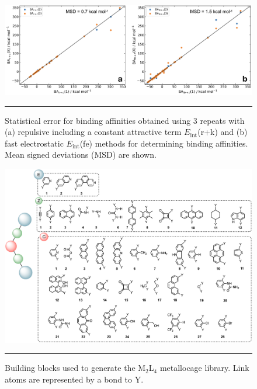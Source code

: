 \documentclass[../../main.tex]{subfiles}
\newcommand{\MLf}{M$_2$L$_4$ }
\begin{document}
\begin{figure}[h!]
	\vspace{0.4cm}
	\centering
	\includegraphics[width=\textwidth]{3/cgbind/figs/figS6}
	\vspace{0.2cm}
	\hrule
	\caption{Statistical error for binding affinities obtained using 3 repeats with (a) repulsive including a constant attractive term $E_\text{int}$(r+k) and (b) fast electrostatic $E_\text{int}$(fe) methods for determining binding affinities. Mean signed deviations (MSD) are shown.}
	\label{fig::si_cg_6}
\end{figure}



\begin{figure}[h!]
	\vspace{0.4cm}
	\centering
	\includegraphics[width=\textwidth]{3/cgbind/figs/figS7}
	\vspace{0.2cm}
	\hrule
	\caption{Building blocks used to generate the \MLf metallocage library. Link atoms are represented by a bond to Y.}
	\label{fig::si_cg_7}
\end{figure}
\end{document}
